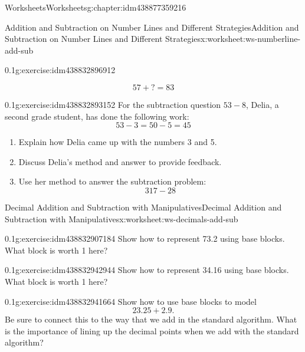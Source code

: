 \documentclass[twoside,11pt,]{book}
\begin{document}
\begin{chapterptx}{Worksheets}{}{Worksheets}{}{}{g:chapter:idm438877359216}
\begin{worksheet-section-numberless}{Addition and Subtraction on Number Lines and Different Strategies}{}{Addition and Subtraction on Number Lines and Different Strategies}{}{}{x:worksheet:ws-numberline-add-sub}
\begin{divisionexercise}{2}{}{0.1}{g:exercise:idm438832896912}
\begin{enumerate}[label=(\alph*)]
\begin{equation*}
57+?=83 
\end{equation*}
%
\end{enumerate}
\end{divisionexercise}%
\begin{divisionexercise}{3}{}{0.1}{g:exercise:idm438832893152}%
For the subtraction question \(53-8\), Delia, a second grade student, has done the following work:%
\begin{equation*}
53- 3=50-5=45
\end{equation*}
%
\leavevmode%
\begin{enumerate}[label=(\alph*)]
\item{}Explain how Delia came up with the numbers 3 and 5.%
\item{}Discuss Delia's method and answer to provide feedback.%
\item{}Use her method to answer the subtraction problem:%
\begin{equation*}
317-28
\end{equation*}
%
\end{enumerate}
\end{divisionexercise}%
\end{worksheet-section-numberless}
\restoregeometry
%
%
\typeout{************************************************}
\typeout{************************************************}
%
\begin{worksheet-section-numberless}{Decimal Addition and Subtraction with Manipulatives}{}{Decimal Addition and Subtraction with Manipulatives}{}{}{x:worksheet:ws-decimals-add-sub}
\begin{divisionexercise}{1}{}{0.1}{g:exercise:idm438832907184}%
Show how to represent 73.2 using base blocks.  What block is worth 1 here?%
\end{divisionexercise}%
\begin{divisionexercise}{2}{}{0.1}{g:exercise:idm438832942944}%
Show how to represent 34.16 using base blocks.  What block is worth 1 here?%
\end{divisionexercise}%
\begin{divisionexercise}{3}{}{0.1}{g:exercise:idm438832941664}%
Show how to use base blocks to model%
\begin{equation*}
23.25+2.9\text{.}
\end{equation*}
Be sure to connect this to the way that we add in the standard algorithm.  What is the importance of lining up the decimal points when we add with the standard algorithm?%

\end{divisionexercise}
\end{worksheet-section-numberless}
\end{chapterptx}
\end{document}
